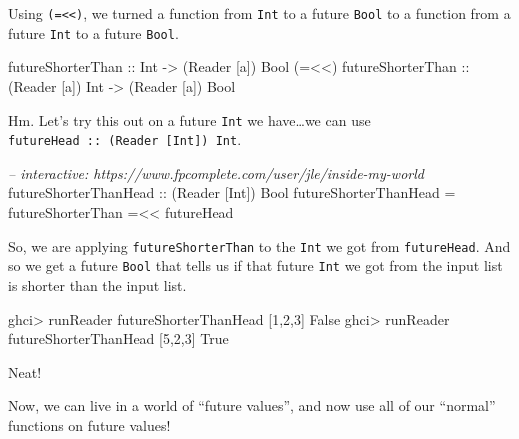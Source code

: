 \documentclass[]{article}
\newenvironment{Shaded}{}{}
\newcommand{\DataTypeTok}[1]{\textcolor[rgb]{0.56,0.13,0.00}{{#1}}}
\newcommand{\DecValTok}[1]{\textcolor[rgb]{0.25,0.63,0.44}{{#1}}}
\newcommand{\CommentTok}[1]{\textcolor[rgb]{0.38,0.63,0.69}{\textit{{#1}}}}
\newcommand{\OtherTok}[1]{\textcolor[rgb]{0.00,0.44,0.13}{{#1}}}
\newcommand{\FunctionTok}[1]{\textcolor[rgb]{0.02,0.16,0.49}{{#1}}}
\newcommand{\NormalTok}[1]{{#1}}
\begin{document}
Using \texttt{(=\textless{}\textless{})}, we turned a function from
\texttt{Int} to a future \texttt{Bool} to a function from a future
\texttt{Int} to a future \texttt{Bool}.

\begin{Shaded}
\begin{Highlighting}[]
\OtherTok{futureShorterThan       ::} \DataTypeTok{Int}              \OtherTok{->} \NormalTok{(}\DataTypeTok{Reader} \NormalTok{[a]) }\DataTypeTok{Bool}
\NormalTok{(}\FunctionTok{=<<}\NormalTok{)}\OtherTok{ futureShorterThan ::} \NormalTok{(}\DataTypeTok{Reader} \NormalTok{[a]) }\DataTypeTok{Int} \OtherTok{->} \NormalTok{(}\DataTypeTok{Reader} \NormalTok{[a]) }\DataTypeTok{Bool}
\end{Highlighting}
\end{Shaded}

Hm. Let's try this out on a future \texttt{Int} we have\ldots{}we can
use \texttt{futureHead\ ::\ (Reader\ {[}Int{]})\ Int}.

\begin{Shaded}
\begin{Highlighting}[]
\CommentTok{-- interactive: https://www.fpcomplete.com/user/jle/inside-my-world}
\OtherTok{futureShorterThanHead ::} \NormalTok{(}\DataTypeTok{Reader} \NormalTok{[}\DataTypeTok{Int}\NormalTok{]) }\DataTypeTok{Bool}
\NormalTok{futureShorterThanHead }\FunctionTok{=} \NormalTok{futureShorterThan }\FunctionTok{=<<} \NormalTok{futureHead}
\end{Highlighting}
\end{Shaded}

So, we are applying \texttt{futureShorterThan} to the \texttt{Int} we
got from \texttt{futureHead}. And so we get a future \texttt{Bool} that
tells us if that future \texttt{Int} we got from the input list is
shorter than the input list.

\begin{Shaded}
\begin{Highlighting}[]
\NormalTok{ghci}\FunctionTok{>} \NormalTok{runReader futureShorterThanHead [}\DecValTok{1}\NormalTok{,}\DecValTok{2}\NormalTok{,}\DecValTok{3}\NormalTok{]}
\DataTypeTok{False}
\NormalTok{ghci}\FunctionTok{>} \NormalTok{runReader futureShorterThanHead [}\DecValTok{5}\NormalTok{,}\DecValTok{2}\NormalTok{,}\DecValTok{3}\NormalTok{]}
\DataTypeTok{True}
\end{Highlighting}
\end{Shaded}

Neat!

Now, we can live in a world of ``future values'', and now use all of our
``normal'' functions on future values!
\end{document}
